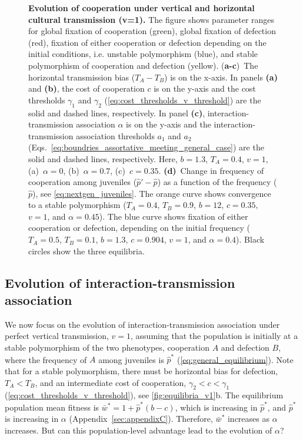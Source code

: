 \documentclass[12pt]{extarticle}
\begin{document}
\begin{figure}[p]
    \caption{\textbf{Evolution of cooperation under vertical and horizontal cultural transmission (v=1).} 
    The figure shows parameter ranges for global fixation of cooperation (green), global fixation of defection (red), fixation of either cooperation or defection depending on the initial conditions, i.e. unstable polymorphism (blue), and stable polymorphism of cooperation and defection (yellow).
    (\textbf{a-c})~The horizontal transmission bias ($T_A-T_B$) is on the x-axis.
    In panels \textbf{(a)} and \textbf{(b)}, the cost of cooperation $c$ is on the y-axis and the cost thresholds $\gamma_1$ and $\gamma_2$ (\autoref{eq:cost_thresholds_v_threshold}) are the solid and dashed lines, respectively. 
	In panel \textbf{(c)}, interaction-transmission association $\alpha$ is on the y-axis and the interaction-transmission association thresholds $a_1$ and $a_2$ (Eqs.~\ref{eq:boundries_assortative_meeting_general_case}) are the solid and dashed lines, respectively.
    Here, $b=1.3$, $T_A=0.4$, $v=1$, (a)~$\alpha = 0$, (b)~$\alpha = 0.7$, (c)~$c = 0.35$.    
    \textbf{(d)}~Change in frequency of cooperation among juveniles ($\hat{p}'-\hat{p}$) as a function of the frequency ($\hat{p}$), see \autoref{eq:nextgen_juveniles}.
    The orange curve shows convergence to a stable polymorphism ($T_A = 0.4$, $T_B = 0.9$, $b = 12$, $c=0.35$, $v=1$, and $\alpha = 0.45$). %
    The blue curve shows fixation of either cooperation or defection, depending on the initial frequency ($T_A = 0.5$, $T_B = 0.1$, $b = 1.3$, $c=0.904$, $v=1$, and $\alpha = 0.4$).
    Black circles show the three equilibria.
  	}
    \label{fig:equilibria_v1}
\end{figure}

\newpage



\subsection{Evolution of interaction-transmission association} 

We now focus on the evolution of interaction-transmission association under perfect vertical transmission, $v=1$, assuming that the population is initially at a stable polymorphism of the two phenotypes, cooperation $A$ and defection $B$, where the frequency of $A$ among juveniles is $\hat{p}^*$ (\autoref{eq:general_equilibrium}).
Note that for a stable polymorphism, there must be horizontal bias for defection, $T_A < T_B$, and an intermediate cost of cooperation, $\gamma_2 < c < \gamma_1$ (\autoref{eq:cost_thresholds_v_threshold}), see \autoref{fig:equilibria_v1}b.
The equilibrium population mean fitness is $\bar{w}^* = 1 + \hat{p}^*(b-c)$, which is increasing in $\hat{p}^*$, and $\hat{p}^*$ is increasing in $\alpha$ (Appendix~\ref{sec:appendixC}).
Therefore, $\bar{w}^*$ increases as $\alpha$ increases.
But can this population-level advantage lead to the evolution of $\alpha$? 
\end{document}
